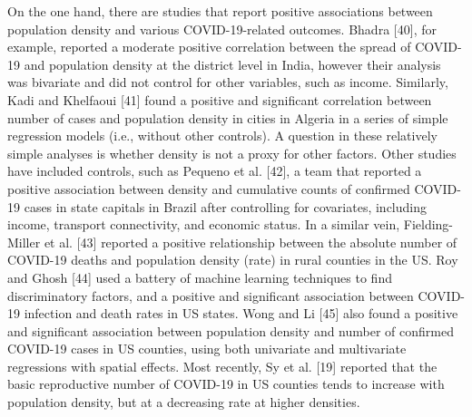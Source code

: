 \documentclass[10pt,letterpaper]{article}
\begin{document}
On the one hand, there are studies that report positive associations
between population density and various COVID-19-related outcomes. Bhadra
{[}40{]}, for example, reported a moderate positive correlation between
the spread of COVID-19 and population density at the district level in
India, however their analysis was bivariate and did not control for
other variables, such as income. Similarly, Kadi and Khelfaoui {[}41{]}
found a positive and significant correlation between number of cases and
population density in cities in Algeria in a series of simple regression
models (i.e., without other controls). A question in these relatively
simple analyses is whether density is not a proxy for other factors.
Other studies have included controls, such as Pequeno et al. {[}42{]}, a
team that reported a positive association between density and cumulative
counts of confirmed COVID-19 cases in state capitals in Brazil after
controlling for covariates, including income, transport connectivity,
and economic status. In a similar vein, Fielding-Miller et al. {[}43{]}
reported a positive relationship between the absolute number of COVID-19
deaths and population density (rate) in rural counties in the US. Roy
and Ghosh {[}44{]} used a battery of machine learning techniques to find
discriminatory factors, and a positive and significant association
between COVID-19 infection and death rates in US states. Wong and Li
{[}45{]} also found a positive and significant association between
population density and number of confirmed COVID-19 cases in US
counties, using both univariate and multivariate regressions with
spatial effects. Most recently, Sy et al. {[}19{]} reported that the
basic reproductive number of COVID-19 in US counties tends to increase
with population density, but at a decreasing rate at higher densities.
\end{document}
